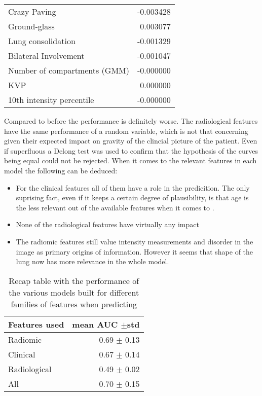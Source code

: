 \begin{table}
\begin{tabular}{lr}
		Crazy Paving                        &                     -0.003428 \\
		Ground-glass                        &                      0.003077 \\
		Lung consolidation                  &                     -0.001329 \\
		Bilateral Involvement               &                     -0.001047 \\
		Number of compartments (GMM)        &                     -0.000000 \\
		KVP                                 &                      0.000000 \\
		10th intensity percentile           &                     -0.000000 \\
		\bottomrule
		\end{tabular}
\end{table}

Compared to before the performance is definitely worse. 
The radiological features have the same performance of a random variable, which is not that concerning given their expected impact on gravity of the clincial picture of the patient.
Even if superfluous a Delong test was used to confirm that the hypothesis of the curves being equal could not be rejected. When it comes to the relevant features in each model the following can be deduced:

\begin{itemize}
\item For the clinical features all of them have a role in the predicition. The only suprising fact, even if it keeps a certain degree of plausibility, is that age is the less relevant out of the available features when it comes to \icu.
\item None of the radiological features have virtually any impact
\item The radiomic features still value intensity measurements and disorder in the image as primary origins of information. However it seems that shape of the lung now has more relevance in the whole model.
\end{itemize}

\begin{table}
\caption{Recap table with the performance of the various models built for different families of features when predicting \icu \label{tab:RecapICU}}
\centering
\begin{tabular}{l|r}
\toprule
Features used & mean AUC $\pm$std\\
\midrule
Radiomic  & 0.69 $\pm$ 0.13\\
Clinical  &  0.67 $\pm$ 0.14\\
Radiological & 0.49 $\pm$ 0.02\\
All & 0.70 $\pm$ 0.15 \\
\bottomrule
\end{tabular}
\end{table}


